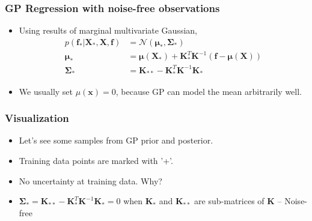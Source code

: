 \documentclass{beamer}
\begin{document}
\begin{frame}
	\frametitle{GP Regression with noise-free observations}
	\begin{itemize}
		\item Using results of marginal multivariate Gaussian,
		\begin{align*}
		 p(\bm{f_*|X_*,X,f}) & = \mathcal{N}(\bm{\mu_*, \Sigma_*}) \\
		 \bm{\mu_*} & = \bm{\mu(X_*)}+\bm{K}_*^T \bm{K}^{-1}(\bm{f-\mu(X)}) \\
		 \bm{\Sigma_*} & = \bm{K}_{**}-\bm{K}_*^T\bm{K}^{-1}\bm{K}_*
		\end{align*}
		\item We usually set $\mu(\bm{x})=0$, because GP can model the mean arbitrarily well.		
	\end{itemize}
\end{frame}
\begin{frame}
	\frametitle{Visualization}
	\begin{itemize}
		\item Let's see some samples from GP prior and posterior.
		\begin{figure}
		\end{figure}
		\item {Training data points are marked with '+'}.
		\item {No uncertainty at training data. Why?}
		\pause
		\item ${\bm{\Sigma_*}=\bm{K}_{**}-\bm{K}_*^T\bm{K}^{-1}\bm{K}_*}=0$ when $\bm{K_*}$ and $\bm{K}_{**}$ are sub-matrices of $\bm{K}$ -- Noise-free
	\end{itemize}
\end{frame}
\end{document}
